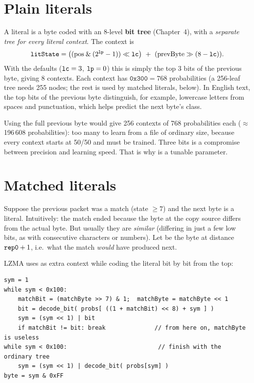 \documentclass[11pt,a4paper,oneside]{book}
\newcommand{\code}[1]{\texttt{\detokenize{#1}}}
\newcommand{\hex}[1]{\texttt{0x#1}}
\begin{document}
\section{Plain literals}

A literal is a byte coded with an 8-level \textbf{bit tree} (Chapter~4), with a \emph{separate tree for every literal context}.
The context is
\[
\code{litState} = \big((\text{pos}\mathbin{\&}(2^{\code{lp}}-1))\ll\code{lc}\big)\ +\ (\text{prevByte}\gg(8-\code{lc})).
\]
With the defaults ($\code{lc}=3$, $\code{lp}=0$) this is simply the top 3 bits of the previous byte, giving 8 contexts. Each context has $\hex{300}=768$
probabilities (a 256-leaf tree needs 255 nodes; the rest is used by matched literals, below). In English text, the top bits of the previous byte
distinguish, for example, lowercase letters from spaces and punctuation, which helps predict the next byte's class.

\begin{keyidea}
Using the full previous byte would give 256 contexts of 768 probabilities each ($\approx$196\,608 probabilities): too many to learn from a file of ordinary size, because every context
starts at 50/50 and must be trained. Three bits is a compromise between precision and learning speed. That is why \code{lc} is a tunable parameter.
\end{keyidea}

\section{Matched literals}

Suppose the previous packet was a match (state $\ge7$) and the next byte is a literal. Intuitively: the match ended because the byte at
the copy source differs from the actual byte. But usually they are \emph{similar} (differing in just a few low bits, as with consecutive characters or numbers).
Let \code{matchByte} be the byte at distance $\code{rep0}+1$, i.e.\ what the match \emph{would} have produced next.

LZMA uses \code{matchByte} as extra context while coding the literal bit by bit from the top:

\begin{lstlisting}[language=pseudo,caption={Matched literal decoding (state $\ge$ 7).}]
sym = 1
while sym < 0x100:
    matchBit = (matchByte >> 7) & 1;  matchByte = matchByte << 1
    bit = decode_bit( probs[ ((1 + matchBit) << 8) + sym ] )
    sym = (sym << 1) | bit
    if matchBit != bit: break              // from here on, matchByte is useless
while sym < 0x100:                          // finish with the ordinary tree
    sym = (sym << 1) | decode_bit( probs[sym] )
byte = sym & 0xFF
\end{lstlisting}
\end{document}
